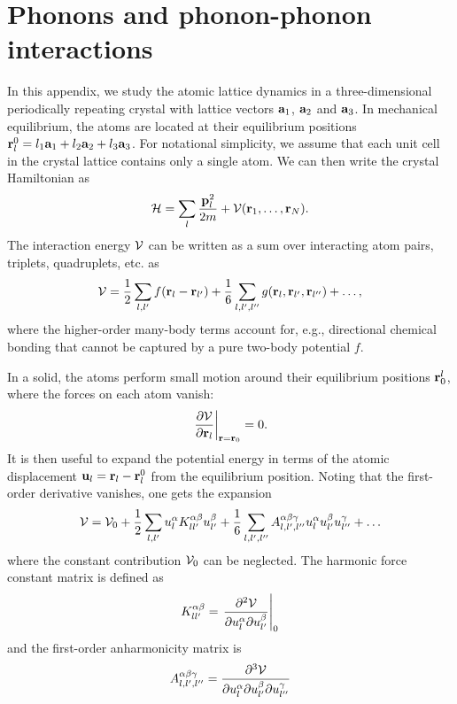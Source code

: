 \appendix
\label{app:phonons}

\chapter{Phonons and phonon-phonon interactions}

In this appendix, we study the atomic lattice dynamics in a three-dimensional periodically repeating crystal with lattice vectors $\mathbf{a}_1$, $\mathbf{a}_2$ and $\mathbf{a}_3$. In mechanical equilibrium, the atoms are located at their equilibrium positions $\mathbf{r}^0_l=l_1\mathbf{a}_1+l_2\mathbf{a}_2+l_3\mathbf{a}_3$. For notational simplicity, we assume that each unit cell in the crystal lattice contains only a single atom. We can then write the crystal Hamiltonian as
\begin{equation}
 \mathcal{H} = \sum_{l} \frac{\mathbf{p}_l^2}{2m} + \mathcal{V}(\mathbf{r}_1,\dots,\mathbf{r}_N).
\end{equation}
The interaction energy $\mathcal{V}$ can be written as a sum over interacting atom pairs, triplets, quadruplets, etc. as
\begin{equation}
 \mathcal{V} = \frac{1}{2} \sum_{l,l'} f(\mathbf{r}_{l}-\mathbf{r}_{l'}) + \frac{1}{6} \sum_{l,l',l''} g(\mathbf{r}_l,\mathbf{r}_{l'},\mathbf{r}_{l''}) + \dots,
\end{equation}
where the higher-order many-body terms account for, e.g., directional chemical bonding that cannot be captured by a pure two-body potential $f$. %

In a solid, the atoms perform small motion around their equilibrium positions $\mathbf{r}_0^l$, where the forces on each atom vanish:
\begin{equation}
  \left. \frac{\partial \mathcal{V}}{\partial \mathbf{r}_l} \right|_{\mathbf{r}=\mathbf{r}_0} = 0.
\end{equation}
It is then useful to expand the potential energy in terms of the atomic displacement $\mathbf{u}_l = \mathbf{r}_l-\mathbf{r}_l^0$ from the equilibrium position. Noting that the first-order derivative vanishes, one gets the expansion
\begin{equation}
 \ca{V} = \ca{V}_0 + \frac{1}{2} \sum_{l,l'} u_l^{\alpha} K_{ll'}^{\alpha\beta}  {u}_{l'}^{\beta} + \frac{1}{6} \sum_{l,l',l''} A^{\alpha \beta \gamma}_{l,l',l''} u^{\alpha}_l u^{\beta}_{l'} u^{\gamma}_{l''} + \dots \label{eq:V_expansion}
\end{equation}
where the constant contribution $\mathcal{V}_0$ can be neglected. The harmonic force constant matrix is defined as
\begin{equation}
K_{ll'}^{\alpha\beta} = \left. \frac{\partial^2 \mathcal{V}}{\partial  u_l^{\alpha}  \partial {u}_{l'}^{\beta}} \right|_0
\end{equation}
and the first-order anharmonicity matrix is 
\begin{equation}
A^{\alpha \beta \gamma}_{l,l',l''} = \frac{\partial^3 \mathcal{V}}{\partial u^{\alpha}_l \partial u^{\beta}_{l'} \partial u^{\gamma}_{l''}} 
\end{equation}

